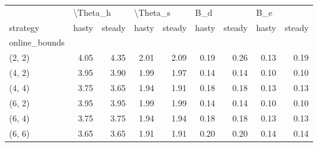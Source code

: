 \begin{tabular}{lrrrrrrrr}
\toprule
{} & \multicolumn{2}{l}{\textbackslash Theta\_h} & \multicolumn{2}{l}{\textbackslash Theta\_s} & \multicolumn{2}{l}{B\_d} & \multicolumn{2}{l}{B\_e} \\
strategy &    hasty & steady &    hasty & steady & hasty & steady & hasty & steady \\
online\_bounds &          &        &          &        &       &        &       &        \\
\midrule
(2, 2)        &     4.05 &   4.35 &     2.01 &   2.09 &  0.19 &   0.26 &  0.13 &   0.19 \\
(4, 2)        &     3.95 &   3.90 &     1.99 &   1.97 &  0.14 &   0.14 &  0.10 &   0.10 \\
(4, 4)        &     3.75 &   3.65 &     1.94 &   1.91 &  0.18 &   0.18 &  0.13 &   0.13 \\
(6, 2)        &     3.95 &   3.95 &     1.99 &   1.99 &  0.14 &   0.14 &  0.10 &   0.10 \\
(6, 4)        &     3.75 &   3.75 &     1.94 &   1.94 &  0.18 &   0.18 &  0.13 &   0.13 \\
(6, 6)        &     3.65 &   3.65 &     1.91 &   1.91 &  0.20 &   0.20 &  0.14 &   0.14 \\
\bottomrule
\end{tabular}
